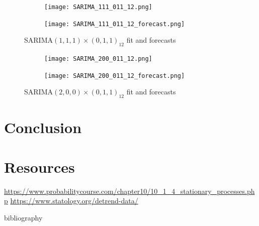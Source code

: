 \documentclass{article}
\begin{document}
  \begin{figure}[H]
    \centering
    \captionsetup{justification=centering}
    \begin{subfigure}[b]{\linewidth}
      \texttt{[image: SARIMA\_111\_011\_12.png]}
    \end{subfigure}
    \begin{subfigure}[b]{\linewidth}
      \texttt{[image: SARIMA\_111\_011\_12\_forecast.png]}
    \end{subfigure}
    \caption{SARIMA$(1,1,1)\times(0,1,1)_{12}$ fit and forecasts}
  \end{figure}

  \begin{figure}[H]
    \centering
    \captionsetup{justification=centering}
    \begin{subfigure}[b]{\linewidth}
      \texttt{[image: SARIMA\_200\_011\_12.png]}
    \end{subfigure}
    \begin{subfigure}[b]{\linewidth}
      \texttt{[image: SARIMA\_200\_011\_12\_forecast.png]}
    \end{subfigure}
    \caption{SARIMA$(2,0,0)\times(0,1,1)_{12}$ fit and forecasts}
  \end{figure}

  \section{Conclusion}

  \section{Resources}
  \url{https://www.probabilitycourse.com/chapter10/10_1_4_stationary_processes.php}
  \url{https://www.statology.org/detrend-data/}

  bibliography\cite{articleFactCheck}
  \printbibliography
\end{document}
